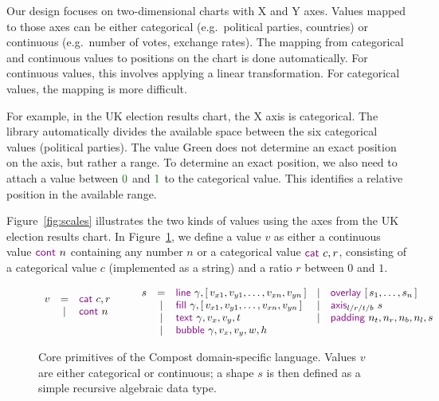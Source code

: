 \documentclass{jfp}
\newcommand{\num}[1]{\textcolor{numclr}{#1}}
\newcommand{\strf}[1]{\textnormal{\textcolor{strclr}{\sffamily #1}}}
\newcommand{\kvd}[1]{\textnormal{\textcolor{kvdclr}{\sffamily #1}}}
\begin{document}
Our design focuses on two-dimensional charts with X and Y axes. Values mapped to those axes
can be either categorical (e.g.~political parties, countries) or continuous
(e.g.~number of votes, exchange rates). The mapping from categorical and continuous values
to positions on the chart is done automatically. For continuous values, this involves
applying a linear transformation. For categorical values, the mapping is more difficult.

For example, in the UK election results chart, the X axis is categorical. The library automatically
divides the available space between the six categorical values (political parties). The value
\strf{Green} does not determine an exact position on the axis, but rather a range. To determine
an exact position, we also need to attach a value between $\num{0}$ and $\num{1}$ to the
categorical value. This identifies a relative position in the available range.

Figure~\ref{fig:scales} illustrates the two kinds of values using the axes from the UK
election results chart. In Figure~\ref{fig:shape}, we define a value $v$ as either a continuous value
$\kvd{cont}~n$ containing any number $n$ or a categorical value $\kvd{cat}~c, r$, consisting
of a categorical value $c$ (implemented as a string) and a ratio $r$ between $0$ and $1$.
%
\begin{figure}
\begin{equation*}
\begin{array}{rcl}
v & = & \kvd{cat}~c, r \\
  & | & \kvd{cont}~n\\
  ~
\end{array}
\qquad
\begin{array}{rclcl}
s & = &\kvd{line}~\gamma, [\,v_{x1}, v_{y1}, \ldots, v_{xn}, v_{yn}\,] & | & \kvd{overlay}~[\,s_1, \ldots, s_n\,]\\
 & | & \kvd{fill}~\gamma, [\,v_{x1}, v_{y1}, \ldots, v_{xn}, v_{yn}\,] & | &\kvd{axis}_{l/r/t/b}~s\\
 & | & \kvd{text}~\gamma, v_x, v_y, t & | &\kvd{padding}~n_t,n_r,n_b,n_l,s\\
 & | & \kvd{bubble}~\gamma, v_x, v_y, w, h
\end{array}
\end{equation*}
\caption{Core primitives of the Compost domain-specific language. Values $v$ are either categorical
  or continuous; a shape $s$ is then defined as a simple recursive algebraic data type.}
\label{fig:shape}
\end{figure}
\end{document}
